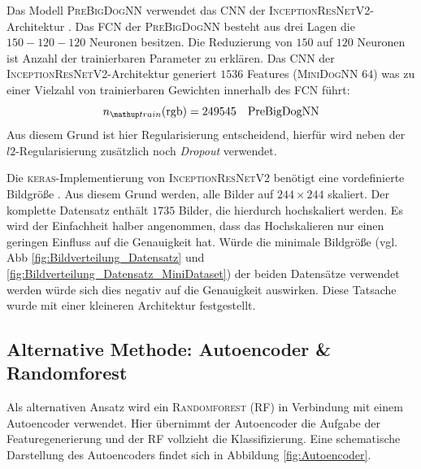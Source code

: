 Das Modell \textsc{PreBigDogNN} verwendet das CNN der
\textsc{InceptionResNetV2}-Architektur \cite{InceptionResNetV2}.
Das FCN der \textsc{PreBigDogNN} besteht aus drei Lagen die $150-120-120$
Neuronen besitzen. Die Reduzierung von
$150$ auf $120$ Neuronen ist Anzahl der trainierbaren Parameter zu erklären.
Das CNN der \textsc{InceptionResNetV2}-Architektur generiert
$1536$ Features (\textsc{MiniDogNN} $64$) was zu einer Vielzahl von
trainierbaren Gewichten innerhalb des FCN führt:
\begin{equation}
  \label{eq:ntrain_PreDogNN_PreBigDogNN}
  n\ua{train}(\mathrm{rgb}) = 249545 \quad \mathrm{PreBigDogNN}
\end{equation}
Aus diesem Grund ist hier Regularisierung entscheidend, hierfür wird neben der
$l2$-Regularisierung zusätzlich noch \emph{Dropout} verwendet.

Die \textsc{keras}-Implementierung von \textsc{InceptionResNetV2} benötigt
eine vordefinierte Bildgröße \cite{InceptionResNetV2}.
Aus diesem Grund werden, alle Bilder auf $244\times 244$ skaliert.
Der komplette Datensatz enthält $1735$ Bilder, die hierdurch hochskaliert werden.
Es wird der Einfachheit halber angenommen, dass das Hochskalieren nur einen
geringen Einfluss auf die Genauigkeit hat. Würde die minimale
Bildgröße (vgl. Abb \ref{fig:Bildverteilung_Datensatz} und
 \ref{fig:Bildverteilung_Datensatz_MiniDataset})
der beiden Datensätze verwendet werden
würde sich dies negativ auf die Genauigkeit auswirken. Diese Tatsache
wurde mit einer kleineren Architektur festgestellt.

\subsection{Alternative Methode: Autoencoder \& Randomforest}
Als alternativen Ansatz wird ein \textsc{Randomforest} (RF)
in Verbindung mit einem Autoencoder verwendet. Hier übernimmt der Autoencoder
die Aufgabe der Featuregenerierung und der RF vollzieht die Klassifizierung.
Eine schematische Darstellung des Autoencoders findet sich in Abbildung \ref{fig:Autoencoder}.

